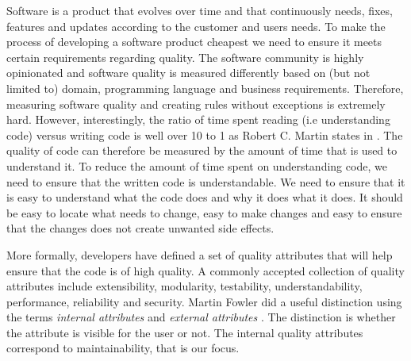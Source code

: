 \documentclass{report}
\begin{document}
Software is a product that evolves over time and that continuously needs, fixes, features and updates according to the customer and users needs. To make the process of developing a software product cheapest we need to ensure it meets certain requirements regarding quality. The software community is highly opinionated and software quality is measured differently based on (but not limited to) domain, programming language and business requirements. Therefore, measuring software quality and creating rules without exceptions is extremely hard. However, interestingly, the ratio of time spent reading (i.e understanding code) versus writing code is well over 10 to 1 as Robert C. Martin states in \cite{Martin:2008:CCH:1388398}. The quality of code can therefore be measured by the amount of time that is used to understand it. To reduce the amount of time spent on understanding code, we need to ensure that the written code is understandable. We need to ensure that it is easy to understand what the code does and why it does what it does. It should be easy to locate what needs to change, easy to make changes and easy to ensure that the changes does not create unwanted side effects. \hfill 
\hfill \newline

More formally, developers have defined a set of quality attributes that will help ensure that the code is of high quality. A commonly accepted collection of quality attributes include extensibility, modularity, testability, understandability, performance, reliability and security. Martin Fowler did a useful distinction using the terms \textit{internal attributes} and \textit{external attributes} \cite{internalExternal}. The distinction is whether the attribute is visible for the user or not. The internal quality attributes correspond to maintainability, that is our focus. 
\end{document}
